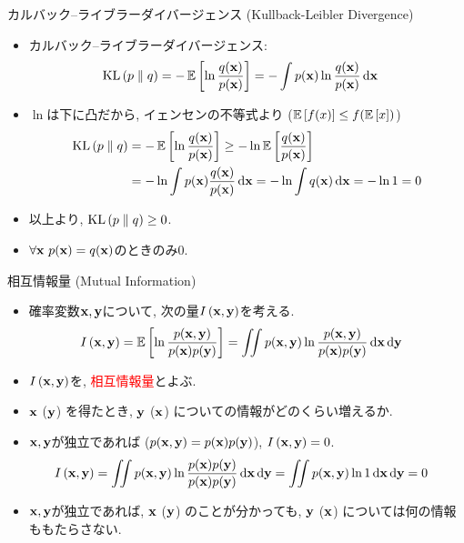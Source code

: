 \documentclass[dvipdfmx,notheorems,t]{beamer}
\begin{document}
\begin{frame}{カルバック--ライブラーダイバージェンス (Kullback-Leibler Divergence)}
\begin{itemize}
  \item カルバック--ライブラーダイバージェンス:
  \begin{align*}
    \operatorname{KL} \left( p \parallel q \right) &= -\operatorname{\mathbb{E}} \left[ \ln \frac{q(\vb{x})}{p(\vb{x})} \right]
      = -\int p(\vb{x}) \ln \frac{q(\vb{x})}{p(\vb{x})} \dd{\vb{x}}
  \end{align*}
  \item $\ln$は下に凸だから, イェンセンの不等式より ($\operatorname{\mathbb{E}} \left[ f(x) \right] \le f(\operatorname{\mathbb{E}} \left[ x \right])$)
  \begin{align*}
    \operatorname{KL} \left( p \parallel q \right) &= -\operatorname{\mathbb{E}} \left[ \ln \frac{q(\vb{x})}{p(\vb{x})} \right]
      \ge -\ln \operatorname{\mathbb{E}} \left[ \frac{q(\vb{x})}{p(\vb{x})} \right] \\
      &= -\ln \int p(\vb{x}) \frac{q(\vb{x})}{p(\vb{x})} \dd{\vb{x}}
      = -\ln \int q(\vb{x}) \dd{\vb{x}} = -\ln 1 = 0
  \end{align*}
  \item 以上より, $\operatorname{KL} \left( p \parallel q \right) \ge 0$.
  \item $\forall \vb{x} \ p(\vb{x}) = q(\vb{x})$のときのみ$0$.
\end{itemize}
\end{frame}

\begin{frame}{相互情報量 (Mutual Information)}
\begin{itemize}
  \item 確率変数$\vb{x}, \vb{y}$について, 次の量$I \left( \vb{x}, \vb{y} \right)$を考える.
  \begin{align*}
    I \left( \vb{x}, \vb{y} \right) &= \operatorname{\mathbb{E}} \left[ \ln \frac{p(\vb{x}, \vb{y})}{p(\vb{x}) p(\vb{y})} \right]
      = \iint p(\vb{x}, \vb{y}) \ln \frac{p(\vb{x}, \vb{y})}{p(\vb{x}) p(\vb{y})} \dd{\vb{x}} \dd{\vb{y}}
  \end{align*}
  \item $I \left( \vb{x}, \vb{y} \right)$を, \textcolor{red}{相互情報量}とよぶ.
  \item $\vb{x}$ ($\vb{y}$) を得たとき, $\vb{y}$ ($\vb{x}$) についての情報がどのくらい増えるか.
  \item $\vb{x}, \vb{y}$が独立であれば ($p(\vb{x}, \vb{y}) = p(\vb{x}) p(\vb{y})$), $I \left( \vb{x}, \vb{y} \right) = 0$.
  \begin{align*}
    I \left( \vb{x}, \vb{y} \right)
      &= \iint p(\vb{x}, \vb{y}) \ln \frac{p(\vb{x}) p(\vb{y})}{p(\vb{x}) p(\vb{y})} \dd{\vb{x}} \dd{\vb{y}}
      = \iint p(\vb{x}, \vb{y}) \ln 1 \dd{\vb{x}} \dd{\vb{y}} = 0
  \end{align*}
  \item $\vb{x}, \vb{y}$が独立であれば, $\vb{x}$ ($\vb{y}$) のことが分かっても,
  $\vb{y}$ ($\vb{x}$) については何の情報ももたらさない.
\end{itemize}
\end{frame}
\end{document}
